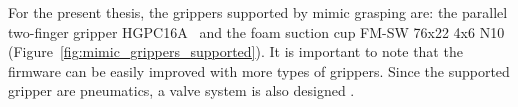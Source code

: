\begin{figure}[h!]
\end{figure}

For the present thesis, the grippers supported by mimic grasping are: the parallel two-finger gripper HGPC16A~\cite{festo_2f} and the foam suction cup FM-SW 76x22 4x6 N10~\cite{schmalz_cup} (Figure~\ref{fig:mimic_grippers_supported}). It is important to note that the firmware can be easily improved with more types of grippers. Since the supported gripper are pneumatics, a valve system is also designed .

